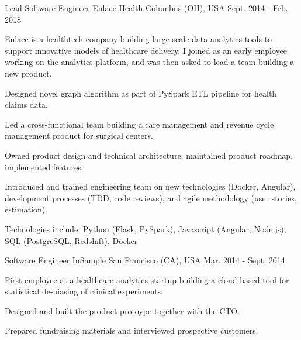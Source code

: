 \begin{cventries}
  \cventry
    {Lead Software Engineer} %
    {Enlace Health} %
    {Columbus (OH), USA} %
    {Sept. 2014 - Feb. 2018} %
    {
      Enlace is a healthtech company building large-scale data analytics tools to support innovative models of healthcare delivery. I joined as an early employee working on the  analytics platform, and was then asked to lead a team building a new product.
      \vspace{5.0mm}
      \begin{cvitems} %
        \item {Designed novel graph algorithm as part of PySpark ETL pipeline for health claims data.}
        \item {Led a cross-functional team building a care management and revenue cycle management product for surgical centers.}
        \item {Owned product design and technical architecture, maintained product roadmap, implemented features.}
        \item {Introduced and trained engineering team on new technologies (Docker, Angular), development processes (TDD, code reviews), and agile methodology (user stories, estimation).}
        \item {Technologies include: Python (Flask, PySpark), Javascript (Angular, Node.js), SQL (PostgreSQL, Redshift), Docker}
      \end{cvitems}
    }

  \cventry
    {Software Engineer} %
    {InSample} %
    {San Francisco (CA), USA} %
    {Mar. 2014 - Sept. 2014} %
    {
    First employee at a healthcare analytics startup building a cloud-based tool for statistical de-biasing of clinical experiments.
    \vspace{5.0mm}
      \begin{cvitems} %
        \item {Designed and built the product protoype together with the CTO.}
        \item {Prepared fundraising materials and interviewed prospective customers.}
      \end{cvitems}
    }


\end{cventries}
